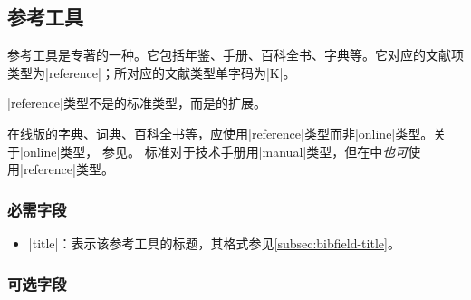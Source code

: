 
\subsection{参考工具}\label{subsec:bibtype-reference}

参考工具是专著的一种。它包括年鉴、手册、百科全书、字典等\cite{gbt3469-1983}。它对应的{\BibTeX}文献项
类型为|reference|；所对应的文献类型单字码为|K|\cite{gbt3469-1983}。

|reference|类型不是{\BibTeX}的标准类型，而是{\njuthesis}的扩展。

\begin{note}
在线版的字典、词典、百科全书等，应使用|reference|类型而非|online|类型。关于|online|类型，
参见\cite{subsec:bibtype-online}。
标准{\BibTeX}对于技术手册用|manual|类型，但在{\njuthesis}中\emph{也可}使
用|reference|类型。
\end{note}

\subsubsection{必需字段}

\begin{itemize}
\item |title|：表示该参考工具的标题，其格式参见\ref{subsec:bibfield-title}。
\end{itemize}

\subsubsection{可选字段}

